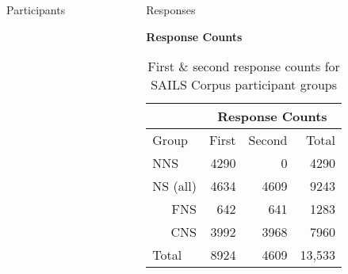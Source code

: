 \documentclass[final,14pt,t]{beamer}
\begin{document}
\begin{frame}{}
\begin{columns}[t]
\begin{column}{.33\linewidth}
\begin{minipage}[t][\textheight]{\linewidth}
\begin{block}{Participants}
\begin{center}
\begin{minipage}{.85\textwidth}
\begin{itemize}
\begin{itemize}
\begin{itemize}
			\end{itemize}
		\end{itemize}
	\end{itemize}
	\vspace{1.3em}
\end{minipage}
\end{center}
\vspace{-.5em}
\end{block}
\end{minipage}
\end{column}

\begin{column}{.33\linewidth}
\begin{minipage}[t][\textheight]{\linewidth} 

\vspace{-1.7em}

\begin{block}{Responses}
\begin{center}
\begin{minipage}{.85\textwidth}


\begin{center}
  \textbf{Response Counts}
\end{center}

\begin{table}[htb!]
\begin{center}
\setlength{\tabcolsep}{0.65em}
\begin{tabular}{|l||r|r||r|}
\hline
& \multicolumn{3}{|c|}{Response Counts} \\
\hline
 Group & First & Second & Total \\
\hline
\hline
NNS & 4290 & 0 & 4290 \\
\hline
\hline
NS (all) & 4634 & 4609 & 9243 \\ 
\hline
\multicolumn{1}{|r||}{FNS} & 642 & 641 & 1283 \\ 
\hline
\multicolumn{1}{|r||}{CNS} & 3992 & 3968 & 7960 \\
\hline
\hline
Total & 8924 & 4609 & 13,533 \\
\hline
\end{tabular}
\caption{\label{tab:response-counts} First \& second response counts for SAILS Corpus participant groups}
\end{center}
\end{table}


\end{minipage}
\end{center}
\end{block}
\end{minipage}
\end{column}
\end{columns}
\end{frame}
\end{document}
